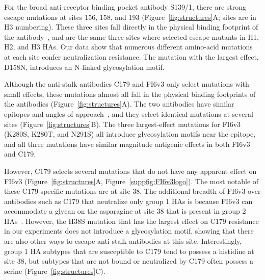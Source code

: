 \documentclass[11pt]{article}
\begin{document}
For the broad anti-receptor binding pocket antibody S139/1, there are strong escape mutations at sites 156, 158, and 193 (Figure~\ref{fig:structures}A; sites are in H3 numbering). 
These three sites fall directly in the physical binding footprint of the antibody~\citep{lee2012heterosubtypic}, and are the same three sites where \citet{yoshida2009cross} selected escape mutants in H1, H2, and H3 HAs. 
Our data show that numerous different amino-acid mutations at each site confer neutralization resistance.
The mutation with the largest effect, D158N, introduces an N-linked glycosylation motif.

Although the anti-stalk antibodies C179 and FI6v3 only select mutations with small effects, these mutations almost all fall in the physical binding footprints of the antibodies (Figure~\ref{fig:structures}A).
The two antibodies have similar epitopes and angles of approach~\citep{dreyfus2013structure}, and they select identical mutations at several sites (Figure~\ref{fig:structures}B). 
The three largest-effect mutations for FI6v3 (K280S, K280T, and N291S) all introduce glycosylation motifs near the epitope, and all three mutations have similar magnitude antigenic effects in both FI6v3 and C179.

However, C179 selects several mutations that do not have any apparent effect on FI6v3 (Figure~\ref{fig:structures}A, Figure~\ref{suppfig:FI6v3logo}).
The most notable of these C179-specific mutations are at site 38.
The additional breadth of FI6v3 over antibodies such as C179 that neutralize only group 1 HAs is because FI6v3 can accommodate a glycan on the asparagine at site 38 that is present in group 2 HAs~\citep{corti2011neutralizing,sui2009structural,ekiert2009antibody}. 
However, the H38S mutation that has the largest effect on C179 resistance in our experiments does not introduce a glycosylation motif, showing that there are also other ways to escape anti-stalk antibodies at this site.
Interestingly, group 1 HA subtypes that are susceptible to C179 tend to possess a histidine at site 38, but subtypes that are not bound or neutralized by C179 often possess a serine (Figure~\ref{fig:structures}C). 
\end{document}
